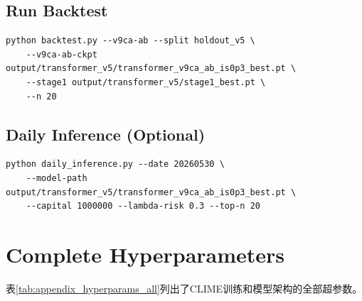 \subsection*{Run Backtest}

\begin{verbatim}
python backtest.py --v9ca-ab --split holdout_v5 \
    --v9ca-ab-ckpt output/transformer_v5/transformer_v9ca_ab_is0p3_best.pt \
    --stage1 output/transformer_v5/stage1_best.pt \
    --n 20
\end{verbatim}

\subsection*{Daily Inference (Optional)}

\begin{verbatim}
python daily_inference.py --date 20260530 \
    --model-path output/transformer_v5/transformer_v9ca_ab_is0p3_best.pt \
    --capital 1000000 --lambda-risk 0.3 --top-n 20
\end{verbatim}

\section{Complete Hyperparameters}
\label{sec:appendix_hyperparams}

表\ref{tab:appendix_hyperparams_all}列出了CLIME训练和模型架构的全部超参数。

